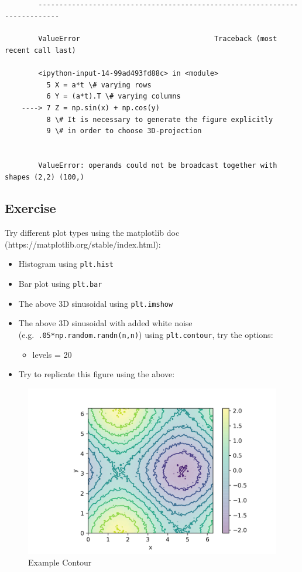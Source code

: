 \documentclass[11pt,a4paper, d]{scrartcl}
\providecommand{\tightlist}{%
      \setlength{\itemsep}{0pt}\setlength{\parskip}{0pt}}
\begin{document}
    \begin{Verbatim}[commandchars=\\\{\}]

        ---------------------------------------------------------------------------

        ValueError                                Traceback (most recent call last)

        <ipython-input-14-99ad493fd88c> in <module>
          5 X = a*t \# varying rows
          6 Y = (a*t).T \# varying columns
    ----> 7 Z = np.sin(x) + np.cos(y)
          8 \# It is necessary to generate the figure explicitly
          9 \# in order to choose 3D-projection


        ValueError: operands could not be broadcast together with shapes (2,2) (100,) 

    \end{Verbatim}

    \hypertarget{exercise}{%
\subsection{Exercise}\label{exercise}}

Try different plot types using the matplotlib doc
(https://matplotlib.org/stable/index.html):

\begin{itemize}
\tightlist
\item
  Histogram using \texttt{plt.hist}
\item
  Bar plot using \texttt{plt.bar}
\item
  The above 3D sinusoidal using \texttt{plt.imshow}
\item
  The above 3D sinusoidal with added white noise
  (e.g.~\texttt{.05*np.random.randn(n,n)}) using \texttt{plt.contour},
  try the options:

  \begin{itemize}
  \tightlist
  \item
    levels = 20
  \end{itemize}
\item
  Try to replicate this figure using the above:
\end{itemize}

\begin{figure}
\centering
\includegraphics{ExampleContour.png}
\caption{Example Contour}
\end{figure}
\end{document}
